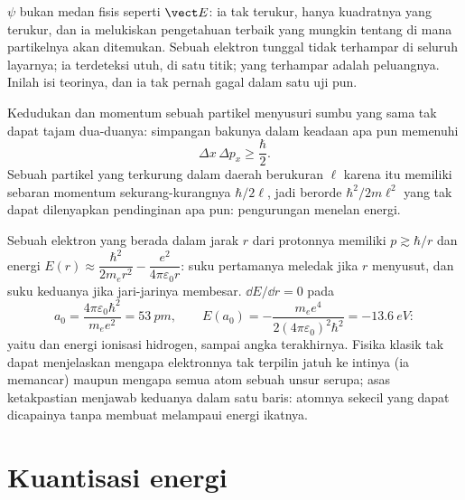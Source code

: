 \begin{remark}\label{rem:b1:quantum-introduction:whatwaves}
$\psi$ bukan medan fisis seperti $\vect E$: ia tak terukur, hanya
kuadratnya yang terukur, dan ia melukiskan pengetahuan terbaik yang mungkin tentang di mana
partikelnya akan ditemukan. Sebuah elektron tunggal tidak terhampar di seluruh
layarnya; ia terdeteksi utuh, di satu titik; yang terhampar adalah
peluangnya. Inilah isi teorinya, dan ia tak pernah gagal
dalam satu uji pun.
\end{remark}

\begin{theorem}\label{thm:b1:quantum-introduction:heisenberg}
Kedudukan dan momentum sebuah partikel menyusuri sumbu yang sama tak dapat
tajam dua-duanya: simpangan bakunya dalam keadaan apa pun memenuhi
\[
\Delta x\,\Delta p_x \geq \frac{\hbar}{2} .
\]
Sebuah partikel yang terkurung dalam daerah berukuran $\ell$ karena itu memiliki sebaran
momentum sekurang-kurangnya $\hbar/2\ell$, jadi  berorde
$\hbar^2/2m\ell^2$ yang tak dapat dilenyapkan pendinginan apa pun: pengurungan menelan energi.
\end{theorem}
\admitted

\begin{example}\label{ex:b1:quantum-introduction:hsize}
Sebuah elektron yang berada dalam jarak $r$ dari protonnya memiliki $p \gtrsim \hbar/r$ dan energi
$E(r) \approx \dfrac{\hbar^2}{2m_er^2} - \dfrac{e^2}{4\pi\varepsilon_0r}$: suku
pertamanya meledak jika $r$ menyusut, dan suku keduanya jika jari-jarinya membesar. $\dd E/\dd r = 0$ pada
\[
a_0 = \frac{4\pi\varepsilon_0\hbar^2}{m_ee^2} = \qty{53}{pm} , \qquad
E(a_0) = -\frac{m_ee^4}{2(4\pi\varepsilon_0)^2\hbar^2} = \qty{-13.6}{eV} :
\]
yaitu \emph{} dan energi ionisasi hidrogen, sampai
angka terakhirnya. Fisika klasik tak dapat menjelaskan mengapa elektronnya tak
terpilin jatuh ke intinya (ia memancar) maupun mengapa semua atom sebuah
unsur serupa; asas ketakpastian menjawab keduanya dalam satu
baris: atomnya sekecil yang dapat dicapainya tanpa membuat 
melampaui energi ikatnya.
\end{example}

\section{Kuantisasi energi}

